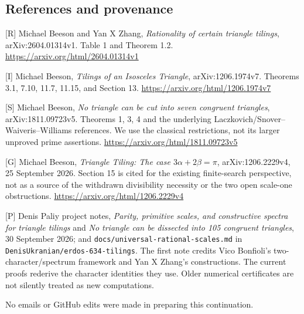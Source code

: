 \documentclass[
  11pt,
]{article}
\begin{document}
\subsection{References and provenance}\label{references-and-provenance}

{[}R{]} Michael Beeson and Yan X Zhang, \emph{Rationality of certain
triangle tilings}, arXiv:2604.01314v1. Table 1 and Theorem 1.2.
\url{https://arxiv.org/html/2604.01314v1}

{[}I{]} Michael Beeson, \emph{Tilings of an Isosceles Triangle},
arXiv:1206.1974v7. Theorems 3.1, 7.10, 11.7, 11.15, and Section 13.
\url{https://arxiv.org/html/1206.1974v7}

{[}S{]} Michael Beeson, \emph{No triangle can be cut into seven
congruent triangles}, arXiv:1811.09723v5. Theorems 1, 3, 4 and the
underlying Laczkovich/Snover--Waiveris--Williams references. We use the
classical restrictions, not its larger unproved prime assertions.
\url{https://arxiv.org/html/1811.09723v5}

{[}G{]} Michael Beeson, \emph{Triangle Tiling: The case
\(3\alpha+2\beta=\pi\)}, arXiv:1206.2229v4, 25 September 2026. Section
15 is cited for the existing finite-search perspective, not as a source
of the withdrawn divisibility necessity or the two open scale-one
obstructions. \url{https://arxiv.org/html/1206.2229v4}

{[}P{]} Denis Paliy project notes, \emph{Parity, primitive scales, and
constructive spectra for triangle tilings} and \emph{No triangle can be
dissected into 105 congruent triangles}, 30 September 2026; and
\texttt{docs/universal-rational-scales.md} in
\texttt{DenisUkranian/erdos-634-tilings}. The first note credits Vico
Bonfioli's two-character/spectrum framework and Yan X Zhang's
constructions. The current proofs rederive the character identities they
use. Older numerical certificates are not silently treated as new
computations.

No emails or GitHub edits were made in preparing this continuation.
\end{document}
